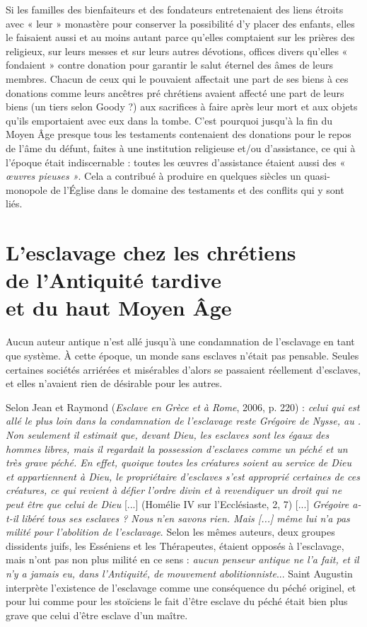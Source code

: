  Si les familles des bienfaiteurs et des fondateurs entretenaient des liens étroits avec « leur » monastère pour conserver la possibilité d'y placer des enfants, elles le faisaient aussi et au moins autant parce qu'elles comptaient sur les prières des religieux, sur leurs messes et sur leurs autres dévotions, offices divers qu'elles « fondaient » contre donation pour garantir le salut éternel des âmes de leurs membres. Chacun de ceux qui le pouvaient affectait une part de ses biens à ces donations comme leurs ancêtres pré chrétiens avaient affecté une part de leurs biens (un tiers selon Goody ?) aux sacrifices à faire après leur mort et aux objets qu'ils emportaient avec eux dans la tombe. C'est pourquoi jusqu'à la fin du Moyen Âge presque tous les testaments contenaient des donations pour le repos de l'âme du défunt, faites à une institution religieuse et/ou d'assistance, ce qui à l'époque était indiscernable : toutes les œuvres d'assistance étaient aussi des « \emph{œuvres pieuses »}. Cela a contribué à produire en quelques siècles un quasi-monopole de l'Église dans le domaine des testaments et des conflits qui y sont liés.
 
 
\section[L'esclavage chez les chrétiens de l'Antiquité tardive et du haut Moyen Âge]{L'esclavage chez les chrétiens\\de l'Antiquité tardive\\et du haut Moyen Âge}


 Aucun auteur antique n'est allé jusqu'à une condamnation de l'esclavage en tant que système. À cette époque, un monde sans esclaves n'était pas pensable. Seules certaines sociétés arriérées et misérables d'alors se passaient réellement d'esclaves, et elles n'avaient rien de désirable pour les autres. 

 Selon Jean  et Raymond  (\emph{Esclave en Grèce et à Rome}, 2006, p. 220) : \emph{celui qui est allé le plus loin dans la condamnation de l'esclavage reste Grégoire de Nysse, au . Non seulement il estimait que, devant Dieu, les esclaves sont les égaux des hommes libres, mais il regardait la possession d'esclaves comme un péché et un très grave péché. En effet, quoique toutes les créatures soient au service de Dieu et appartiennent à Dieu, le propriétaire d'esclaves s'est approprié certaines de ces créatures, ce qui revient à défier l'ordre divin et à revendiquer un droit qui ne peut être que celui de Dieu} [...] (Homélie IV sur l'Ecclésiaste, 2, 7) [...] \emph{Grégoire a-t-il libéré tous ses esclaves ? Nous n'en savons rien. Mais \emph{[...]} même lui n'a pas milité pour l'abolition de l'esclavage}. Selon les mêmes auteurs, deux groupes dissidents juifs, les Esséniens et les Thérapeutes, étaient opposés à l'esclavage, mais n'ont pas non plus milité en ce sens : \emph{aucun penseur antique ne l'a fait, et il n'y a jamais eu, dans l'Antiquité, de mouvement abolitionniste}... Saint Augustin interprète l'existence de l'esclavage comme une conséquence du péché originel, et pour lui comme pour les stoïciens le fait d'être esclave du péché était bien plus grave que celui d'être esclave d'un maître. 
 
